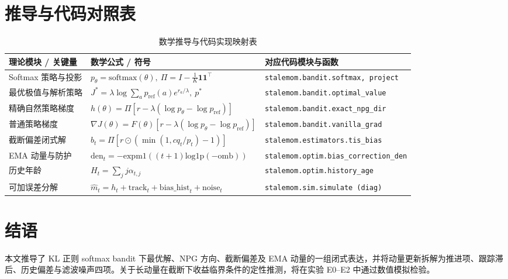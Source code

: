 \documentclass[11pt, a4paper, UTF8]{ctexart}
\begin{document}
\section{推导与代码对照表}

\begin{table}[H]
\centering
\small
\renewcommand{\arraystretch}{1.3}
\begin{tabularx}{\textwidth}{llX}
\toprule
\textbf{理论模块 / 关键量} & \textbf{数学公式 / 符号} & \textbf{对应代码模块与函数} \\
\midrule
Softmax 策略与投影 & $p_\theta = \mathrm{softmax}(\theta), \ \Pi = I - \frac{1}{K}\mathbf{1}\mathbf{1}^\top$ & \texttt{stalemom.bandit.softmax, project} \\
最优极值与解析策略 & $J^* = \lambda \log \sum_a p_{\mathrm{ref}}(a) e^{r_a/\lambda}, \ p^*$ & \texttt{stalemom.bandit.optimal\_value} \\
精确自然策略梯度 & $h(\theta) = \Pi[r - \lambda(\log p_\theta - \log p_{\mathrm{ref}})]$ & \texttt{stalemom.bandit.exact\_npg\_dir} \\
普通策略梯度 & $\nabla J(\theta) = F(\theta)[r - \lambda(\log p_\theta - \log p_{\mathrm{ref}})]$ & \texttt{stalemom.bandit.vanilla\_grad} \\
截断偏差闭式解 & $b_t = \Pi[r \odot (\min(1, cq_t/p_t) - 1)]$ & \texttt{stalemom.estimators.tis\_bias} \\
EMA 动量与防护 & $\mathrm{den}_t = -\mathrm{expm1}((t+1)\mathrm{log1p}(-\mathrm{omb}))$ & \texttt{stalemom.optim.\allowbreak bias\_correction\_den} \\
历史年龄 & $H_t = \sum_j j \alpha_{t, j}$ & \texttt{stalemom.optim.history\_age} \\
可加误差分解 & $\hat{m}_t = h_t + \mathrm{track}_t + \mathrm{bias\_hist}_t + \mathrm{noise}_t$ & \texttt{stalemom.sim.simulate (diag)} \\
\bottomrule
\end{tabularx}
\caption{数学推导与代码实现映射表}
\label{tab:mapping}
\end{table}

\section{结语}
本文推导了 KL 正则 softmax bandit 下最优解、NPG 方向、截断偏差及 EMA 动量的一组闭式表达，并将动量更新拆解为推进项、跟踪滞后、历史偏差与滤波噪声四项。关于长动量在截断下收益临界条件的定性推测，将在实验 E0--E2 中通过数值模拟检验。
\end{document}
